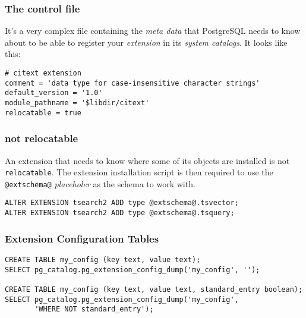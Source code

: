 \documentclass[english]{beamer}
\begin{document}
\begin{frame}[fragile]
  \frametitle{The control file}

  It's a very complex file containing the \textit{meta data} that PostgreSQL
  needs to know about to be able to register your \textit{extension} in its
  \textit{system catalogs}. It looks like this:
  \linebreak

  \begin{example}
\begin{verbatim}
# citext extension
comment = 'data type for case-insensitive character strings'
default_version = '1.0'
module_pathname = '$libdir/citext'
relocatable = true
\end{verbatim}
  \end{example}
\end{frame}


\begin{frame}[fragile]
  \frametitle{not relocatable}

  An extension that needs to know where some of its objects are installed is
  not \texttt{relocatable}.  The extension installation script is then
  required to use the \texttt{@extschema@} \textit{placeholer} as the schema
  to work with.

  \begin{example}
\begin{verbatim}
ALTER EXTENSION tsearch2 ADD type @extschema@.tsvector;
ALTER EXTENSION tsearch2 ADD type @extschema@.tsquery;
\end{verbatim}
  \end{example}
\end{frame}

\begin{frame}[fragile]
  \frametitle{Extension Configuration Tables}

  \begin{example}
\begin{verbatim}
CREATE TABLE my_config (key text, value text);
SELECT pg_catalog.pg_extension_config_dump('my_config', '');

CREATE TABLE my_config (key text, value text, standard_entry boolean);
SELECT pg_catalog.pg_extension_config_dump('my_config',
       'WHERE NOT standard_entry');

\end{verbatim}
  \end{example}  
\end{frame}
\end{document}
